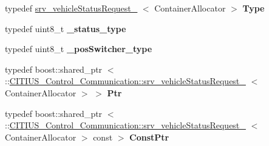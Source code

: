 \begin{DoxyCompactItemize}
\item 
\hypertarget{struct_c_i_t_i_u_s___control___communication_1_1srv__vehicle_status_request___a96c6cbc3dca19c614a6517e751b0e9b0}{typedef \*
\hyperlink{struct_c_i_t_i_u_s___control___communication_1_1srv__vehicle_status_request__}{srv\-\_\-vehicle\-Status\-Request\-\_\-}\*
$<$ \-Container\-Allocator $>$ {\bfseries \-Type}}\label{struct_c_i_t_i_u_s___control___communication_1_1srv__vehicle_status_request___a96c6cbc3dca19c614a6517e751b0e9b0}

\item 
\hypertarget{struct_c_i_t_i_u_s___control___communication_1_1srv__vehicle_status_request___af98d271e435b212cca25e005277583e9}{typedef uint8\-\_\-t {\bfseries \-\_\-status\-\_\-type}}\label{struct_c_i_t_i_u_s___control___communication_1_1srv__vehicle_status_request___af98d271e435b212cca25e005277583e9}

\item 
\hypertarget{struct_c_i_t_i_u_s___control___communication_1_1srv__vehicle_status_request___a1a7a8306254dc29090444aa387cc21dd}{typedef uint8\-\_\-t {\bfseries \-\_\-pos\-Switcher\-\_\-type}}\label{struct_c_i_t_i_u_s___control___communication_1_1srv__vehicle_status_request___a1a7a8306254dc29090444aa387cc21dd}

\item 
\hypertarget{struct_c_i_t_i_u_s___control___communication_1_1srv__vehicle_status_request___a960a2c26d6e6921cbfa18f5f84bcf984}{typedef boost\-::shared\-\_\-ptr\*
$<$ \-::\hyperlink{struct_c_i_t_i_u_s___control___communication_1_1srv__vehicle_status_request__}{\-C\-I\-T\-I\-U\-S\-\_\-\-Control\-\_\-\-Communication\-::srv\-\_\-vehicle\-Status\-Request\-\_\-}\*
$<$ \-Container\-Allocator $>$ $>$ {\bfseries \-Ptr}}\label{struct_c_i_t_i_u_s___control___communication_1_1srv__vehicle_status_request___a960a2c26d6e6921cbfa18f5f84bcf984}

\item 
\hypertarget{struct_c_i_t_i_u_s___control___communication_1_1srv__vehicle_status_request___a7a01a2ad1c393d0411766f02ed547c6b}{typedef boost\-::shared\-\_\-ptr\*
$<$ \-::\hyperlink{struct_c_i_t_i_u_s___control___communication_1_1srv__vehicle_status_request__}{\-C\-I\-T\-I\-U\-S\-\_\-\-Control\-\_\-\-Communication\-::srv\-\_\-vehicle\-Status\-Request\-\_\-}\*
$<$ \-Container\-Allocator $>$ const  $>$ {\bfseries \-Const\-Ptr}}\label{struct_c_i_t_i_u_s___control___communication_1_1srv__vehicle_status_request___a7a01a2ad1c393d0411766f02ed547c6b}

\end{DoxyCompactItemize}
